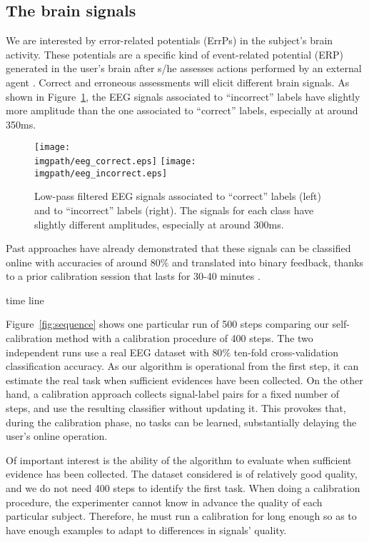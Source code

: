 \subsection{The brain signals}

We are interested by error-related potentials (ErrPs) in the subject's brain activity. These potentials are a specific kind of event-related potential (ERP) generated in the user's brain after s/he assesses actions performed by an external agent \cite{chavarriaga2010learning}. Correct and erroneous assessments will elicit different brain signals. As shown in Figure~\ref{fig:EEGsample}, the EEG signals associated to ``incorrect'' labels have slightly more amplitude than the one associated to ``correct'' labels, especially at around 350ms.

\begin{figure}[!htbp]
\centering
\texttt{[image: \\imgpath/eeg\_correct.eps]}
\texttt{[image: \\imgpath/eeg\_incorrect.eps]}
\caption{Low-pass filtered EEG signals associated to ``correct'' labels (left) and to ``incorrect'' labels (right). The signals for each class have slightly different amplitudes, especially at around 300ms.}
\label{fig:EEGsample}
\end{figure}

Past approaches have already demonstrated that these signals can be classified online with accuracies of around 80\% and translated into binary feedback, thanks to a prior calibration session that lasts for 30-40 minutes \cite{chavarriaga2010learning, iturrate2013task}.

time line

Figure~\ref{fig:sequence} shows one particular run of 500 steps comparing our self-calibration method with a calibration procedure of 400 steps. The two independent runs use a real EEG dataset with $80\%$ ten-fold cross-validation classification accuracy. As our algorithm is operational from the first step, it can estimate the real task when sufficient evidences have been collected. On the other hand, a calibration approach collects signal-label pairs for a fixed number of steps, and use the resulting classifier without updating it. This provokes that, during the calibration phase, no tasks can be learned, substantially delaying the user's online operation. 

Of important interest is the ability of the algorithm to evaluate when sufficient evidence has been collected. The dataset considered is of relatively good quality, and we do not need 400 steps to identify the first task. When doing a calibration procedure, the experimenter cannot know in advance the quality of each particular subject. Therefore, he must run a calibration for long enough so as to have enough examples to adapt to differences in signals' quality. 

